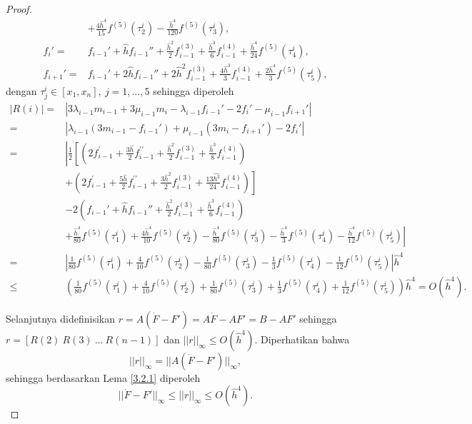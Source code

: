 \begin{proof}
\begin{align*}
        &+ \frac{4\hat{h}^4}{15}f^{(5)}(\tau_2^i) - \frac{\hat{h}^4}{120}f^{(5)}(\tau_3^i),\\
        f_i' =& f_{i-1}' + \hat{h}f_{i-1}'' + \frac{\hat{h}^2}{2}f_{i-1}^{(3)} + \frac{\hat{h}^3}{6}f^{(4)}_{i-1} + \frac{\hat{h}^4}{24}f^{(5)}(\tau_4^i), \\
        f_{i+1}' =& f_{i-1}' + 2\hat{h}f_{i-1}'' + 2\hat{h}^2f_{i-1}^{(3)} + \frac{4\hat{h}^3}{3}f^{(4)}_{i-1} + \frac{2\hat{h}^4}{3}f^{(5)}(\tau_5^i),
    \end{align*}
    dengan $\tau_j^i \in [x_1,x_n],~j=1,\dots,5$ sehingga diperoleh
    \begin{align*}
        |R(i)|=&|3\lambda_{i-1}m_{i-1} + 3\mu_{i-1}m_i - \lambda_{i-1}f_{i-1}' - 2f_i' - \mu_{i-1}f_{i+1}'|\\
        =&|\lambda_{i-1}(3m_{i-1}-f_{i-1}')+\mu_{i-1}(3m_i-f_{i+1}')-2f_i'|\\
        =&\left|\frac{1}{2}\left[\left(2 f_{i-1}^{\prime}+\frac{3\hat{h}}{2} f_{i-1}^{\prime \prime}+\frac{\hat{h}^2}{2} f_{i-1}^{(3)} + \frac{\hat{h}^3}{8}f_{i-1}^{(4)}\right)\right.\right.\\
        &+\left.\left(2 f_{i-1}^{\prime}+\frac{5\hat{h}}{2} f_{i-1}^{\prime \prime}+\frac{3\hat{h}^2}{2} f_{i-1}^{(3)} + \frac{13\hat{h^3}}{24}f_{i-1}^{(4)}\right)\right]\\
        &-2\left(f_{i-1}' + \hat{h}f_{i-1}'' + \frac{\hat{h}^2}{2}f_{i-1}^{(3)} + \frac{\hat{h}^3}{6}f^{(4)}_{i-1}\right)\\
        &\left.+ \frac{\hat{h}^4}{80}f^{(5)}(\tau_1^i) + \frac{4\hat{h}^4}{10}f^{(5)}(\tau_2^i) - \frac{\hat{h}^4}{80}f^{(5)}(\tau_3^i) - \frac{\hat{h}^4}{3}f^{(5)}(\tau_4^i) - \frac{\hat{h}^4}{12}f^{(5)}(\tau_5^i)\right|\\
        =&\left| \frac{1}{80}f^{(5)}(\tau_1^i) + \frac{4}{10}f^{(5)}(\tau_2^i) - \frac{1}{80}f^{(5)}(\tau_3^i) - \frac{1}{3}f^{(5)}(\tau_4^i) - \frac{1}{12}f^{(5)}(\tau_5^i)\right| \hat{h}^4 \\
        \leq& \left( \frac{1}{80}f^{(5)}(\tau_1^i) + \frac{4}{10}f^{(5)}(\tau_2^i) + \frac{1}{80}f^{(5)}(\tau_3^i) + \frac{1}{3}f^{(5)}(\tau_4^i) + \frac{1}{12}f^{(5)}(\tau_5^i)\right)\hat{h}^{4}=O(\hat{h}^{4}).
    \end{align*}

    Selanjutnya didefinisikan $r=A(\dot{F}-F')=A\dot{F}-AF'=B-AF'$ sehingga $r = [R(2) ~ R(3) ~ \dots ~ R(n-1)]$ dan $||r||_\infty \leq O(\hat{h}^4)$. Diperhatikan bahwa 
    $$||r||_\infty = ||A(\dot{F}-F')||_\infty,$$ 
    sehingga berdasarkan Lema \ref{3.2.1} diperoleh $$||\dot{F}-F'||_\infty \leq ||r||_\infty \leq O(\hat{h}^4).$$
\end{proof}

